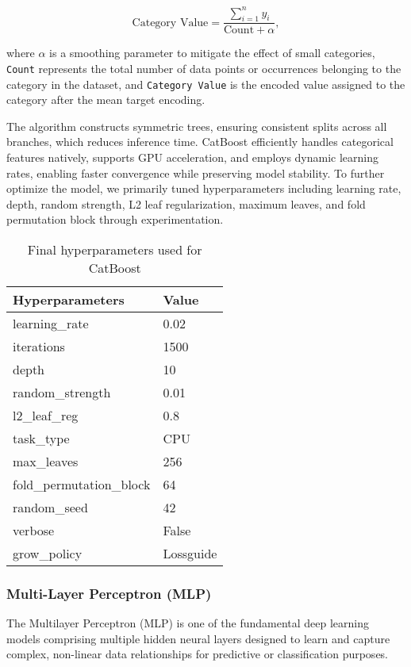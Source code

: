 \documentclass{article}
\begin{document}
\begin{equation}
\text{Category Value} = \frac{\sum_{i=1}^{n} y_i}{\text{Count} + \alpha},
\end{equation}

where $\alpha$ is a smoothing parameter to mitigate the effect of small categories, \texttt{Count} represents the total number of data points or occurrences belonging to the category in the dataset, and \texttt{Category Value} is the encoded value assigned to the category after the mean target encoding.

The algorithm constructs symmetric trees, ensuring consistent splits across all branches, which reduces inference time. CatBoost efficiently handles categorical features natively, supports GPU acceleration, and employs dynamic learning rates, enabling faster convergence while preserving model stability. To further optimize the model, we primarily tuned hyperparameters including learning rate, depth, random strength, L2 leaf regularization, maximum leaves, and fold permutation block through experimentation.

\begin{table}[h]
   \centering
   \caption{Final hyperparameters used for CatBoost}
   \begin{tabular}{ll}
       \hline
       \textbf{Hyperparameters} & \textbf{Value} \\
       \hline
       learning\_rate & 0.02 \\
       iterations & 1500 \\
       depth & 10 \\
       random\_strength & 0.01 \\
       l2\_leaf\_reg & 0.8 \\
       task\_type & CPU \\
       max\_leaves & 256 \\
       fold\_permutation\_block & 64 \\
       random\_seed & 42 \\
       verbose & False \\
       grow\_policy & Lossguide \\
       \hline
   \end{tabular}
\end{table}
\newpage
\subsubsection{Multi-Layer Perceptron (MLP)}

The Multilayer Perceptron (MLP) is one of the fundamental deep learning models comprising multiple hidden neural layers designed to learn and capture complex, non-linear data relationships for predictive or classification purposes.
\end{document}
